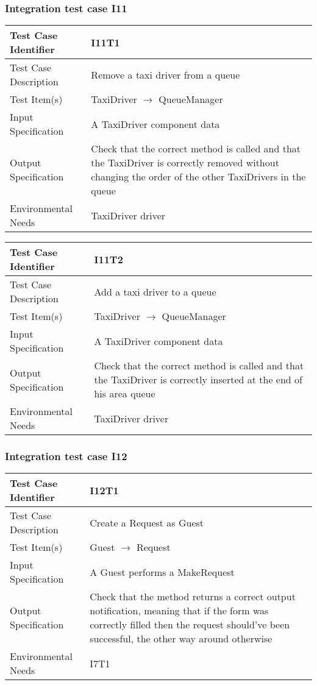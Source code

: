 		\subsubsection{Integration test case I11}
		\begin{center}
			\begin{tabular}{ |l p{10cm}| } \hline
				Test Case Identifier & I11T1 \\ \hline
				Test Case Description & Remove a taxi driver from a queue \\ \hline
				Test Item(s) & TaxiDriver $\rightarrow$ QueueManager \\ \hline
				Input Specification & A TaxiDriver component data \\ \hline
				Output Specification & Check that the correct method is called and that the TaxiDriver is
				correctly removed without changing the order of the other TaxiDrivers in the queue \\ \hline
				Environmental Needs & TaxiDriver driver \\ \hline
			\end{tabular}
			\begin{tabular}{ |l p{10cm}| } \hline
				Test Case Identifier & I11T2 \\ \hline
				Test Case Description & Add a taxi driver to a queue \\ \hline
				Test Item(s) & TaxiDriver $\rightarrow$ QueueManager \\ \hline
				Input Specification & A TaxiDriver component data \\ \hline
				Output Specification & Check that the correct method is called and that the TaxiDriver is
				correctly inserted at the end of his area queue \\ \hline
				Environmental Needs & TaxiDriver driver \\ \hline
			\end{tabular}
		\end{center}
		\subsubsection{Integration test case I12}
		\begin{center}
			\begin{tabular}{ |l p{10cm}| } \hline
				Test Case Identifier & I12T1 \\ \hline
				Test Case Description & Create a Request as Guest \\ \hline
				Test Item(s) & Guest $\rightarrow$ Request \\ \hline
				Input Specification & A Guest performs a MakeRequest\\ \hline
				Output Specification & Check that the method returns a correct output notification, meaning that if the form was correctly filled then
				the request should've been successful, the other way around otherwise \\ \hline
				Environmental Needs & I7T1 \\ \hline
			\end{tabular}
		\end{center}
